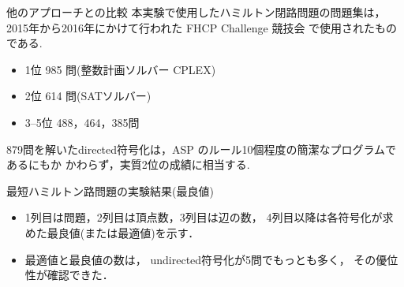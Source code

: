 \documentclass[dvipdfmx,10pt]{beamer}
\begin{document}
\begin{frame}{他のアプローチとの比較}
本実験で使用したハミルトン閉路問題の問題集は，
2015年から2016年にかけて行われた FHCP Challenge 競技会
で使用されたものである.
\begin{itemize}
\item 1位 985 問(整数計画ソルバー CPLEX)
\item 2位 614 問(SATソルバー)
\item 3--5位 488，464，385問
\end{itemize}
\begin{alertblock}{}
879問を解いた\textsf{directed}符号化は，ASP 
のルール10個程度の簡潔なプログラムであるにもか
かわらず，実質2位の成績に相当する.
\end{alertblock}
\end{frame}
\begin{frame}{最短ハミルトン路問題の実験結果(最良値)}
\begin{itemize}
\item 1列目は問題，2列目は頂点数，3列目は辺の数，
      4列目以降は各符号化が求めた最良値(または最適値)を示す．
\item 最適値と最良値の数は，
      \textsf{undirected}符号化が5問でもっとも多く，
      その優位性が確認できた．
\end{itemize}
\end{frame}
\end{document}
